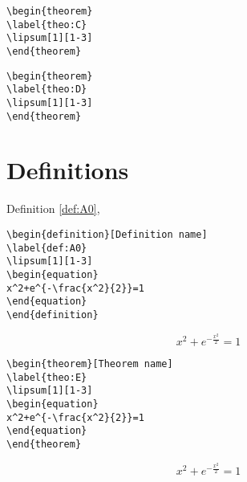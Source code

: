 \begin{verbatim}
\begin{theorem}
\label{theo:C}
\lipsum[1][1-3]
\end{theorem}
\end{verbatim}
\begin{theorem}
\label{theo:C}
\lipsum[1][1-3]
\end{theorem}

\begin{verbatim}
\begin{theorem}
\label{theo:D}
\lipsum[1][1-3]
\end{theorem}
\end{verbatim}
\begin{theorem}
\label{theo:D}
\lipsum[1][1-3]
\end{theorem}


\section{Definitions}

Definition \ref{def:A0},
\begin{verbatim}
\begin{definition}[Definition name]
\label{def:A0}
\lipsum[1][1-3]
\begin{equation}
x^2+e^{-\frac{x^2}{2}}=1
\end{equation}
\end{definition}
\end{verbatim}
\begin{definition}
\label{def:A0}
\lipsum[1][1-3]
\begin{equation}
x^2+e^{-\frac{x^2}{2}}=1
\end{equation}
\end{definition}

\begin{verbatim}
\begin{theorem}[Theorem name]
\label{theo:E}
\lipsum[1][1-3]
\begin{equation}
x^2+e^{-\frac{x^2}{2}}=1
\end{equation}
\end{theorem}
\end{verbatim}
\begin{theorem}
\label{theo:E}
\lipsum[1][1-3]
\begin{equation}
x^2+e^{-\frac{x^2}{2}}=1
\end{equation}
\end{theorem}

